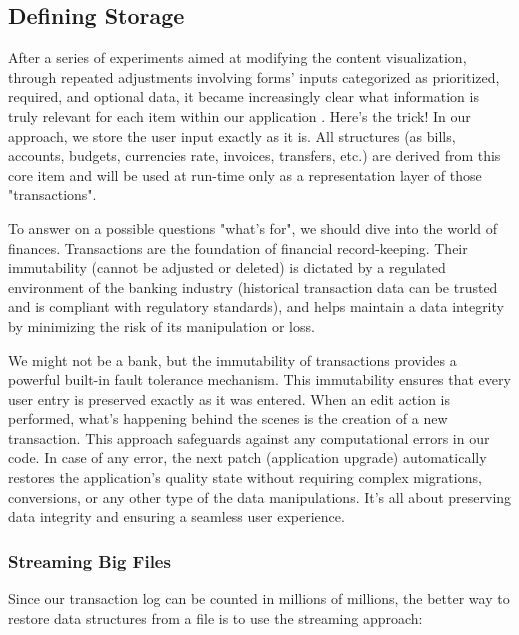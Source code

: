 
\subsection{Defining Storage}

After a series of experiments aimed at modifying the content visualization, through repeated adjustments involving 
forms' inputs categorized as prioritized, required, and optional data, it became increasingly clear what information is 
truly relevant for each item within our application . Here's the trick! In our approach, we store the user 
input exactly as it is. All structures (as bills, accounts, budgets, currencies rate, invoices, transfers, etc.) are 
derived from this core item and will be used at run-time only as a representation layer of those "transactions".

To answer on a possible questions "what's for", we should dive into the world of finances. Transactions are the 
foundation of financial record-keeping. Their immutability (cannot be adjusted or deleted) is dictated by a regulated 
environment of the banking industry (historical transaction data can be trusted and is compliant with regulatory 
standards), and helps maintain a data integrity by minimizing the risk of its manipulation or loss.

\noindent We might not be a bank, but the immutability of transactions provides a powerful built-in fault tolerance 
mechanism. This immutability ensures that every user entry is preserved exactly as it was entered. When an edit action 
is performed, what's happening behind the scenes is the creation of a new transaction. This approach safeguards against 
any computational errors in our code. In case of any error, the next patch (application upgrade) automatically 
restores the application's quality state without requiring complex migrations, conversions, or any other type of 
the data manipulations. It's all about preserving data integrity and ensuring a seamless user experience.


\subsubsection{Streaming Big Files}

Since our transaction log can be counted in millions of millions, the better way to restore data structures from a file
is to use the streaming approach:

